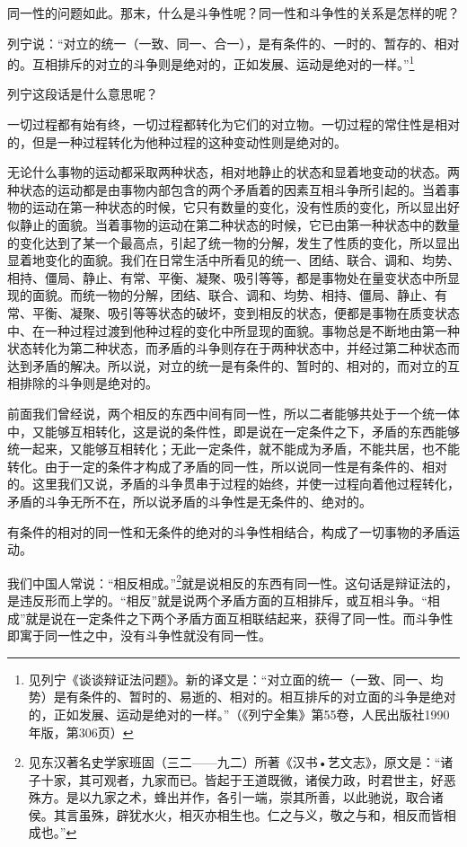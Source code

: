 \documentclass[UTF8, 12pt, a4paper]{ctexrep}
\begin{document}
同一性的问题如此。那末，什么是斗争性呢？同一性和斗争性的关系是怎样的呢？

列宁说：“对立的统一（一致、同一、合一），是有条件的、一时的、暂存的、相对的。互相排斥的对立的斗争则是绝对的，正如发展、运动是绝对的一样。”\footnote{见列宁《谈谈辩证法问题》。新的译文是：“对立面的统一（一致、同一、均势）是有条件的、暂时的、易逝的、相对的。相互排斥的对立面的斗争是绝对的，正如发展、运动是绝对的一样。”（《列宁全集》第55卷，人民出版社1990年版，第306页）}

列宁这段话是什么意思呢？

一切过程都有始有终，一切过程都转化为它们的对立物。一切过程的常住性是相对的，但是一种过程转化为他种过程的这种变动性则是绝对的。

无论什么事物的运动都采取两种状态，相对地静止的状态和显着地变动的状态。两种状态的运动都是由事物内部包含的两个矛盾着的因素互相斗争所引起的。当着事物的运动在第一种状态的时候，它只有数量的变化，没有性质的变化，所以显出好似静止的面貌。当着事物的运动在第二种状态的时候，它已由第一种状态中的数量的变化达到了某一个最高点，引起了统一物的分解，发生了性质的变化，所以显出显着地变化的面貌。我们在日常生活中所看见的统一、团结、联合、调和、均势、相持、僵局、静止、有常、平衡、凝聚、吸引等等，都是事物处在量变状态中所显现的面貌。而统一物的分解，团结、联合、调和、均势、相持、僵局、静止、有常、平衡、凝聚、吸引等等状态的破坏，变到相反的状态，便都是事物在质变状态中、在一种过程过渡到他种过程的变化中所显现的面貌。事物总是不断地由第一种状态转化为第二种状态，而矛盾的斗争则存在于两种状态中，并经过第二种状态而达到矛盾的解决。所以说，对立的统一是有条件的、暂时的、相对的，而对立的互相排除的斗争则是绝对的。

前面我们曾经说，两个相反的东西中间有同一性，所以二者能够共处于一个统一体中，又能够互相转化，这是说的条件性，即是说在一定条件之下，矛盾的东西能够统一起来，又能够互相转化；无此一定条件，就不能成为矛盾，不能共居，也不能转化。由于一定的条件才构成了矛盾的同一性，所以说同一性是有条件的、相对的。这里我们又说，矛盾的斗争贯串于过程的始终，并使一过程向着他过程转化，矛盾的斗争无所不在，所以说矛盾的斗争性是无条件的、绝对的。

有条件的相对的同一性和无条件的绝对的斗争性相结合，构成了一切事物的矛盾运动。

我们中国人常说：“相反相成。”\footnote{见东汉著名史学家班固（三二——九二）所著《汉书•艺文志》，原文是：“诸子十家，其可观者，九家而已。皆起于王道既微，诸侯力政，时君世主，好恶殊方。是以九家之术，蜂出并作，各引一端，崇其所善，以此驰说，取合诸侯。其言虽殊，辟犹水火，相灭亦相生也。仁之与义，敬之与和，相反而皆相成也。”}就是说相反的东西有同一性。这句话是辩证法的，是违反形而上学的。“相反”就是说两个矛盾方面的互相排斥，或互相斗争。“相成”就是说在一定条件之下两个矛盾方面互相联结起来，获得了同一性。而斗争性即寓于同一性之中，没有斗争性就没有同一性。
\end{document}
